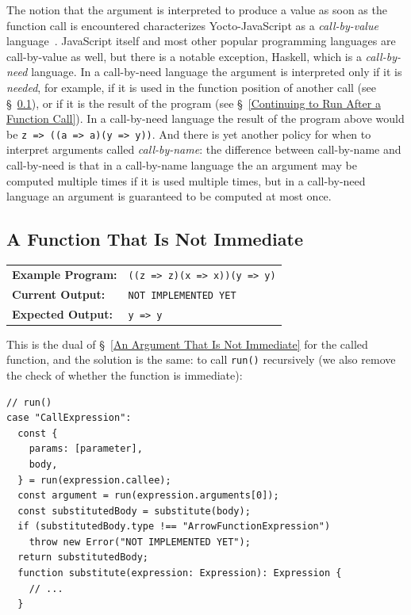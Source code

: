 \documentclass[12pt, oneside]{book}
\begin{document}
\begin{mdframed}[frametitle = {Advanced}]
The notion that the argument is interpreted to produce a value as soon as the function call is encountered characterizes Yocto-JavaScript as a \emph{call-by-value} language~\cite{call-by-name-call-by-value-and-the-lambda-calculus}. JavaScript itself and most other popular programming languages are call-by-value as well, but there is a notable exception, Haskell, which is a \emph{call-by-need} language. In a call-by-need language the argument is interpreted only if it is \emph{needed}, for example, if it is used in the function position of another call (see §~\ref{A Function That Is Not Immediate}), or if it is the result of the program (see §~\ref{Continuing to Run After a Function Call}). In a call-by-need language the result of the program above would be \texttt{z => ((a => a)(y => y))}. And there is yet another policy for when to interpret arguments called \emph{call-by-name}: the difference between call-by-name and call-by-need is that in a call-by-name language the an argument may be computed multiple times if it is used multiple times, but in a call-by-need language an argument is guaranteed to be computed at most once.
\end{mdframed}

\subsection{A Function That Is Not Immediate}
\label{A Function That Is Not Immediate}

\begin{center}
\begin{tabular}{ll}
\textbf{Example Program:} & \texttt{((z => z)(x => x))(y => y)} \\
\textbf{Current Output:} & \texttt{NOT IMPLEMENTED YET} \\
\textbf{Expected Output:} & \texttt{y => y} \\
\end{tabular}
\end{center}

This is the dual of §~\ref{An Argument That Is Not Immediate} for the called function, and the solution is the same: to call \texttt{run()} recursively (we also remove the check of whether the function is immediate):

\begin{verbatim}
// run()
case "CallExpression":
  const {
    params: [parameter],
    body,
  } = run(expression.callee);
  const argument = run(expression.arguments[0]);
  const substitutedBody = substitute(body);
  if (substitutedBody.type !== "ArrowFunctionExpression")
    throw new Error("NOT IMPLEMENTED YET");
  return substitutedBody;
  function substitute(expression: Expression): Expression {
    // ...
  }
\end{verbatim}
\end{document}
